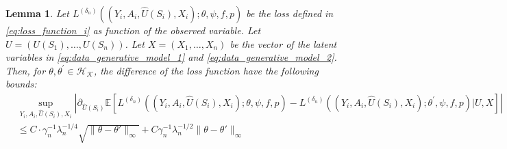 \documentclass[12pt]{article}
\newtheorem{lemma}{Lemma}%
\newcommand{\E}{\mathbb{E}}
\begin{document}
\begin{lemma}\label{L_i_derivative_U_diff}
    Let $L^{(\delta_n)}((Y_i,A_i,\widehat U(S_i),X_i);\theta,\psi,f,p)$ be the loss  defined in \eqref{eq:loss_function_i} as function of the observed variable. Let $U = (U(S_1),\ldots,U(S_n))$. Let $X = (X_1,\ldots,X_n)$ be the vector of the latent variables in \eqref{eq:data_generative_model_1} and \eqref{eq:data_generative_model_2}. Then, for $\theta,\theta^\prime\in \mathcal{H}_{\mathcal{K}}$, the difference of the loss function have the following bounds:
          \begin{align*}
        &\sup_{Y_i,A_i,\widehat U(S_i),X_i}\left|\partial_{\widehat U(S_i)} \E\left[L^{(\delta_n)}((Y_i,A_i,\widehat U(S_i),X_i);\theta,\psi,f,p) - L^{(\delta_n)}((Y_i,A_i,\widehat U(S_i),X_i);\theta^\prime,\psi,f,p)|U,X\right]\right|\\
        & \leq C\cdot \gamma_n^{-1}\lambda_n^{-1/4}\sqrt{\|\theta-\theta'\|_\infty} + C\gamma_n^{-1}\lambda_n^{-1/2}\|\theta-\theta'\|_\infty
    \end{align*}
\end{lemma}
\end{document}
